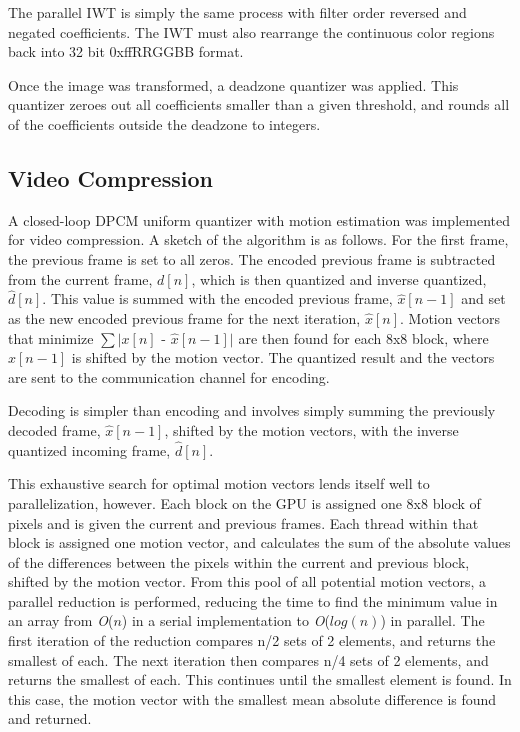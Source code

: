 \documentclass[10pt,twocolumn,twoside]{IEEEtran}
\renewcommand{\O}[1]{\textit{O}(\ensuremath{#1})}
\begin{document}
The parallel IWT is simply the same process with filter order reversed and negated coefficients. The IWT must also rearrange the continuous color regions back into 32 bit 0xffRRGGBB format.

Once the image was transformed, a deadzone quantizer was applied. This quantizer zeroes out all coefficients smaller than a given threshold, and rounds all of the coefficients outside the deadzone to integers.

\subsection{Video Compression}
A closed-loop DPCM uniform quantizer with motion estimation was implemented for video compression. A sketch of the algorithm is as follows. For the first frame, the previous frame is set to all zeros. The encoded previous frame is subtracted from the current frame, $d[n]$, which is then quantized and inverse quantized, $\hat{d}[n]$. This value is summed with the encoded previous frame, $\hat{x}[n-1]$ and set as the new encoded previous frame for the next iteration, $\hat{x}[n]$. Motion vectors that minimize $\sum$$\mid$$x[n]$ - $\hat{x}[n-1]$$\mid$ are then found for each 8x8 block, where $\hat{x}[n-1]$ is shifted by the motion vector. The quantized result and the vectors are sent to the communication channel for encoding.

Decoding is simpler than encoding and involves simply summing the previously decoded frame, $\hat{x}[n-1]$, shifted by the motion vectors, with the inverse quantized incoming frame, $\hat{d}[n]$.

This exhaustive search for optimal motion vectors lends itself well to parallelization, however. Each block on the GPU is assigned one 8x8 block of pixels and is given the current and previous frames. Each thread within that block is assigned one motion vector, and calculates the sum of the absolute values of the differences between the pixels within the current and previous block, shifted by the motion vector. From this pool of all potential motion vectors, a parallel reduction is performed, reducing the time to find the minimum value in an array from \O{n} in a serial implementation to \O{log(n)} in parallel. The first iteration of the reduction compares n/2 sets of 2 elements, and returns the smallest of each. The next iteration then compares n/4 sets of 2 elements, and returns the smallest of each. This continues until the smallest element is found. In this case, the motion vector with the smallest mean absolute difference is found and returned. 
\end{document}
